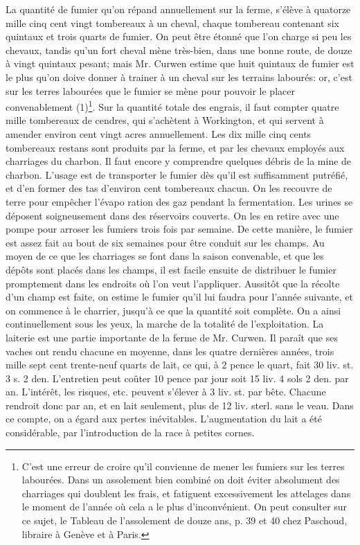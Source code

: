 La quantité de fumier qu'on répand annuellement sur la ferme, s'élève à quatorze mille cinq cent vingt tombereaux à un cheval, chaque tombereau contenant six quintaux et trois quarts de fumier. On peut être\setcounter{page}{208} étonné que l’on charge si peu les chevaux, tandis qu’un fort cheval mène très-bien, dans une bonne route, de douze à vingt quintaux pesant; mais Mr. Curwen estime que huit quintaux de fumier est le plus qu’on doive donner à trainer à un cheval sur les terrains labourés: or, c’est sur les terres labourées que le fumier se mène pour pouvoir le placer convenablement (1)\footnote{C’est une erreur de croire qu’il convienne de mener les fumiers sur les terres labourées. Dans un assolement bien combiné on doit éviter absolument des charriages qui doublent les frais, et fatiguent excessivement les attelages dans le moment de l’année où cela a le plus d’inconvénient. On peut consulter sur ce sujet, le Tableau de l’assolement de douze ans, p. 39 et 40 chez Paschoud, libraire à Genève et à Paris.}. Sur la quantité totale des engrais, il faut compter quatre mille tombereaux de cendres, qui s’achètent à Workington, et qui servent à amender environ cent vingt acres annuellement. Les dix mille cinq cents tombereaux restans sont produits par la ferme, et par les chevaux employés aux charriages du charbon. Il faut encore y comprendre quelques débris de la mine de charbon. L’usage est de transporter le fumier dès qu’il est suffisamment putréfié, et d’en former des tas d’environ cent tombereaux chacun. On les recouvre de terre pour empêcher l’évapo\setcounter{page}{209} ration des gaz pendant la fermentation.
Les urines se déposent soigneusement dans des réservoirs couverts. On les en retire avec une pompe pour arroser les fumiers trois fois par semaine. De cette manière, le fumier est assez fait au bout de six semaines pour être conduit sur les champs. Au moyen de ce que les charriages se font dans la saison convenable, et que les dépôts sont placés dans les champs, il est facile ensuite de distribuer le fumier promptement dans les endroits où l'on veut l'appliquer. Aussitôt que la récolte d'un champ est faite, on estime le fumier qu'il lui faudra pour l'année suivante, et on commence à le charrier, jusqu'à ce que la quantité soit complète. On a ainsi continuellement sous les yeux, la marche de la totalité de l'exploitation.
La laiterie est une partie importante de la ferme de Mr. Curwen. Il paraît que ses vaches ont rendu chacune en moyenne, dans les quatre dernières années, trois mille sept cent trente-neuf quarts de lait, ce qui, à 2 pence le quart, fait 30 liv. st. 3 s. 2 den. L'entretien peut coûter 10 pence par jour soit 15 liv. 4 sols 2 den. par an. L'intérêt, les risques, etc. peuvent s'élever à 3 liv. st. par bête. Chacune rendroit donc par an, et en lait seulement, plus de 12 liv. sterl. sans le veau. Dans ce compte, on a égard aux\setcounter{page}{210} pertes inévitables. L'augmentation du lait a été considérable, par l'introduction de la race à petites cornes.
